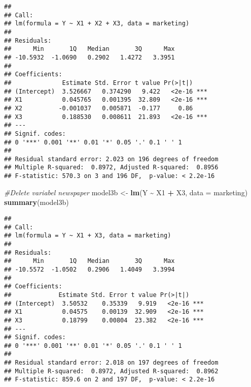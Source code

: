 \documentclass[
]{article}
\newenvironment{Shaded}{\begin{snugshade}}{\end{snugshade}}
\newcommand{\AttributeTok}[1]{\textcolor[rgb]{0.13,0.29,0.53}{#1}}
\newcommand{\CommentTok}[1]{\textcolor[rgb]{0.56,0.35,0.01}{\textit{#1}}}
\newcommand{\FunctionTok}[1]{\textcolor[rgb]{0.13,0.29,0.53}{\textbf{#1}}}
\newcommand{\NormalTok}[1]{#1}
\newcommand{\OtherTok}[1]{\textcolor[rgb]{0.56,0.35,0.01}{#1}}
\newcommand{\SpecialCharTok}[1]{\textcolor[rgb]{0.81,0.36,0.00}{\textbf{#1}}}
\begin{document}
\begin{Shaded}
\end{Shaded}

\begin{verbatim}
## 
## Call:
## lm(formula = Y ~ X1 + X2 + X3, data = marketing)
## 
## Residuals:
##      Min       1Q   Median       3Q      Max 
## -10.5932  -1.0690   0.2902   1.4272   3.3951 
## 
## Coefficients:
##              Estimate Std. Error t value Pr(>|t|)    
## (Intercept)  3.526667   0.374290   9.422   <2e-16 ***
## X1           0.045765   0.001395  32.809   <2e-16 ***
## X2          -0.001037   0.005871  -0.177     0.86    
## X3           0.188530   0.008611  21.893   <2e-16 ***
## ---
## Signif. codes:  
## 0 '***' 0.001 '**' 0.01 '*' 0.05 '.' 0.1 ' ' 1
## 
## Residual standard error: 2.023 on 196 degrees of freedom
## Multiple R-squared:  0.8972, Adjusted R-squared:  0.8956 
## F-statistic: 570.3 on 3 and 196 DF,  p-value: < 2.2e-16
\end{verbatim}

\begin{Shaded}
\begin{Highlighting}[]
\CommentTok{\#Delete variabel newspaper}
\NormalTok{model3b }\OtherTok{\textless{}{-}} \FunctionTok{lm}\NormalTok{(Y }\SpecialCharTok{\textasciitilde{}}\NormalTok{ X1 }\SpecialCharTok{+}\NormalTok{ X3, }\AttributeTok{data =}\NormalTok{ marketing)}
\FunctionTok{summary}\NormalTok{(model3b)}
\end{Highlighting}
\end{Shaded}

\begin{verbatim}
## 
## Call:
## lm(formula = Y ~ X1 + X3, data = marketing)
## 
## Residuals:
##      Min       1Q   Median       3Q      Max 
## -10.5572  -1.0502   0.2906   1.4049   3.3994 
## 
## Coefficients:
##             Estimate Std. Error t value Pr(>|t|)    
## (Intercept)  3.50532    0.35339   9.919   <2e-16 ***
## X1           0.04575    0.00139  32.909   <2e-16 ***
## X3           0.18799    0.00804  23.382   <2e-16 ***
## ---
## Signif. codes:  
## 0 '***' 0.001 '**' 0.01 '*' 0.05 '.' 0.1 ' ' 1
## 
## Residual standard error: 2.018 on 197 degrees of freedom
## Multiple R-squared:  0.8972, Adjusted R-squared:  0.8962 
## F-statistic: 859.6 on 2 and 197 DF,  p-value: < 2.2e-16
\end{verbatim}
\end{document}
